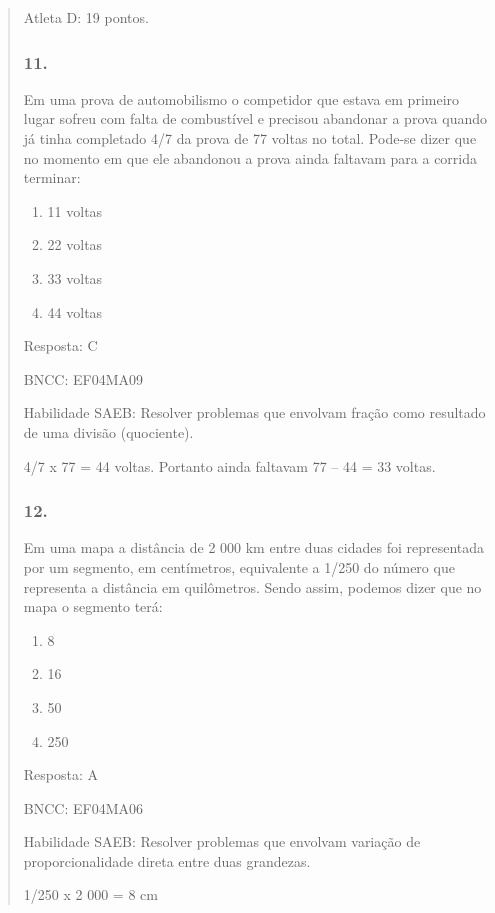 \begin{enumerate}
\begin{escolha}
\begin{enumerate}
\begin{itemize}
\begin{itemize}
\begin{escolha}
\begin{quote}
\begin{escolha}
{Atleta D: 19 pontos.

\subsubsection{11.}\label{section-197}

Em uma prova de automobilismo o competidor que estava em primeiro lugar
sofreu com falta de combustível e precisou abandonar a prova quando já
tinha completado 4/7 da prova de 77 voltas no total. Pode-se dizer que
no momento em que ele abandonou a prova ainda faltavam para a corrida
terminar:

\begin{enumerate}
\def\labelenumi{\alph{enumi})}
\item
  11 voltas
\item
  22 voltas
\item
  33 voltas
\item
  44 voltas
\end{enumerate}

Resposta: C

BNCC: EF04MA09

Habilidade SAEB: Resolver problemas que envolvam fração como resultado
de uma divisão (quociente).

4/7 x 77 = 44 voltas. Portanto ainda faltavam 77 -- 44 = 33 voltas.

\subsubsection{12.}\label{section-198}

Em uma mapa a distância de 2 000 km entre duas cidades foi representada
por um segmento, em centímetros, equivalente a 1/250 do número que
representa a distância em quilômetros. Sendo assim, podemos dizer que no
mapa o segmento terá:

\begin{enumerate}
\def\labelenumi{\alph{enumi})}
\item
  8
\item
  16
\item
  50
\item
  250
\end{enumerate}

Resposta: A

BNCC: EF04MA06

Habilidade SAEB: Resolver problemas que envolvam variação de
proporcionalidade direta entre duas grandezas.

1/250 x 2 000 = 8 cm

}
\end{escolha}
\end{quote}
\end{escolha}
\end{itemize}
\end{itemize}
\end{enumerate}
\end{escolha}
\end{enumerate}
